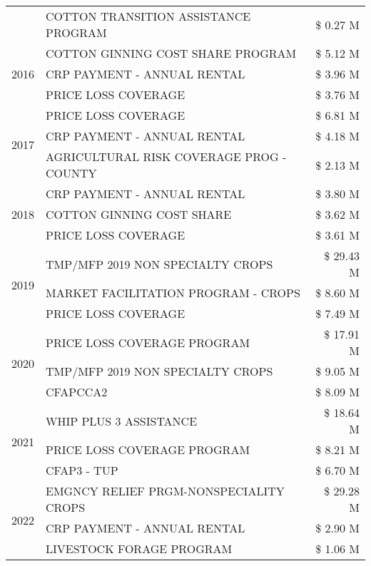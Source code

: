 \begin{tabular}{llr}
 & COTTON TRANSITION ASSISTANCE PROGRAM & \$ 0.27 M \\
\cline{1-3}
\multirow[t]{3}{*}{2016} & COTTON GINNING COST SHARE PROGRAM & \$ 5.12 M \\
 & CRP PAYMENT - ANNUAL RENTAL & \$ 3.96 M \\
 & PRICE LOSS COVERAGE & \$ 3.76 M \\
\cline{1-3}
\multirow[t]{3}{*}{2017} & PRICE LOSS COVERAGE & \$ 6.81 M \\
 & CRP PAYMENT - ANNUAL RENTAL & \$ 4.18 M \\
 & AGRICULTURAL RISK COVERAGE PROG - COUNTY & \$ 2.13 M \\
\cline{1-3}
\multirow[t]{3}{*}{2018} & CRP PAYMENT - ANNUAL RENTAL & \$ 3.80 M \\
 & COTTON GINNING COST SHARE & \$ 3.62 M \\
 & PRICE LOSS COVERAGE & \$ 3.61 M \\
\cline{1-3}
\multirow[t]{3}{*}{2019} & TMP/MFP 2019 NON SPECIALTY CROPS & \$ 29.43 M \\
 & MARKET FACILITATION PROGRAM - CROPS & \$ 8.60 M \\
 & PRICE LOSS COVERAGE & \$ 7.49 M \\
\cline{1-3}
\multirow[t]{3}{*}{2020} & PRICE LOSS COVERAGE PROGRAM & \$ 17.91 M \\
 & TMP/MFP 2019 NON SPECIALTY CROPS & \$ 9.05 M \\
 & CFAPCCA2 & \$ 8.09 M \\
\cline{1-3}
\multirow[t]{3}{*}{2021} & WHIP PLUS 3 ASSISTANCE & \$ 18.64 M \\
 & PRICE LOSS COVERAGE PROGRAM & \$ 8.21 M \\
 & CFAP3 - TUP & \$ 6.70 M \\
\cline{1-3}
\multirow[t]{3}{*}{2022} & EMGNCY RELIEF PRGM-NONSPECIALITY CROPS & \$ 29.28 M \\
 & CRP PAYMENT - ANNUAL RENTAL & \$ 2.90 M \\
 & LIVESTOCK FORAGE PROGRAM & \$ 1.06 M \\
\cline{1-3}
\bottomrule
\end{tabular}
